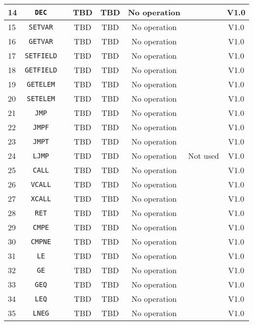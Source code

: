 \documentclass{article}
\begin{document}
\begin{longtable}{|l|c|c|c|c|c|c|c|}
		14 & \texttt{DEC} & & TBD & TBD & No operation & & \textsf{V1.0} \\ \hline
		15 & \texttt{SETVAR} & & TBD & TBD & No operation & & \textsf{V1.0} \\ \hline
		16 & \texttt{GETVAR} & & TBD & TBD & No operation & & \textsf{V1.0} \\ \hline
		17 & \texttt{SETFIELD} & & TBD & TBD & No operation & & \textsf{V1.0} \\ \hline
		18 & \texttt{GETFIELD} & & TBD & TBD & No operation & & \textsf{V1.0} \\ \hline
		19 & \texttt{GETELEM} & & TBD & TBD & No operation & & \textsf{V1.0} \\ \hline
		20 & \texttt{SETELEM} & & TBD & TBD & No operation & & \textsf{V1.0} \\ \hline
		21 & \texttt{JMP} & & TBD & TBD & No operation & & \textsf{V1.0} \\ \hline
		22 & \texttt{JMPF} & & TBD & TBD & No operation & & \textsf{V1.0} \\ \hline
		23 & \texttt{JMPT} & & TBD & TBD & No operation & & \textsf{V1.0} \\ \hline
		24 & \texttt{LJMP} & & TBD & TBD & No operation & Not used & \textsf{V1.0} \\ \hline
		25 & \texttt{CALL} & & TBD & TBD & No operation & & \textsf{V1.0} \\ \hline
		26 & \texttt{VCALL} & & TBD & TBD & No operation & & \textsf{V1.0} \\ \hline
		27 & \texttt{XCALL} & & TBD & TBD & No operation & & \textsf{V1.0} \\ \hline
		28 & \texttt{RET} & & TBD & TBD & No operation & & \textsf{V1.0} \\ \hline
		29 & \texttt{CMPE} & & TBD & TBD & No operation & & \textsf{V1.0} \\ \hline
		30 & \texttt{CMPNE} & & TBD & TBD & No operation & & \textsf{V1.0} \\ \hline
		31 & \texttt{LE} & & TBD & TBD & No operation & & \textsf{V1.0} \\ \hline
		32 & \texttt{GE} & & TBD & TBD & No operation & & \textsf{V1.0} \\ \hline
		33 & \texttt{GEQ} & & TBD & TBD & No operation & & \textsf{V1.0} \\ \hline
		34 & \texttt{LEQ} & & TBD & TBD & No operation & & \textsf{V1.0} \\ \hline
		35 & \texttt{LNEG} & & TBD & TBD & No operation & & \textsf{V1.0} \\ \hline

\end{longtable}
\end{document}
